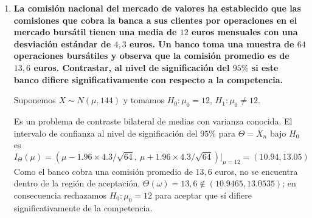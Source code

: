 \begin{enumerate}
  Tomamos el estimador $\Theta = \overline{X}_n$, $\alpha = 0.95$ (con $Q = 1.66$, $\overline{x}_n = 110$). Suponiendo que (hipótesis nula) $H_0 : X \sim N(100, 225)$ (el método no funciona) y exploramos la condición $1 - \alpha = \Prob(\overline{X}_n \geq a)$. Tenemos
  \[
    1 - \alpha = \Prob(\overline{X}_n \geq a) \iff 1 - \alpha = \Prob(N \geq (a - \mu)/\Sigma) = 1 - \Phi((a - \mu)/\Sigma)
  \]
  \[
    \iff \alpha = \Phi((a - \mu)/\Sigma) \iff a = \mu + \frac{\sigma}{\sqrt{n}} Q_\alpha
  \]
  Regla de decisión: No rechazar $H_0 \iff \overline{x}_n < \mu + \frac{\sigma}{\sqrt{n}} Q_\alpha \equiv a$.

  Las regiones de rechazo son
  \[
    F = (a, \infty); \quad S_1 := \{\vec{x} : (x_1 + \dots + x_n > na\} \in \mathbb{R}^n; \quad C := \{\omega : \overline{X}_n(\omega) > a\} \in \Omega
  \]
  Bajo la hipótesis nula $\mu = 100$ el valor obtenido
  \[
    t \equiv \overline{x}_n = 110; \quad \mu = 100; \quad Q_\alpha = 1.65; \quad \frac{\sigma}{\sqrt{n}} Q_\alpha = \frac{15}{\sqrt{8}} \times 1.65 = 8.75; \implies
  \]
  \[
    110 > \mu + \frac{\sigma}{\sqrt{n}} Q_\alpha = 108.75
  \]
  luego al nivel de seguridad del $95\%$ debemos rechazar $H_0$ y aceptar $H_1$ (el método sí funciona).
  El $p$-valor se calcula como
  \[
    p := \Prob(\overline{X}_n \geq 110) = \Prob(N \geq (t - \mu)/\Sigma) = \Prob(N \geq 10 \times \sqrt{8}/15) = \Prob(N \geq 1.88) = 0.03
  \]
  bajo $H_0 : \mu = \mu_0$.
  \item \textbf{La comisión nacional del mercado de valores ha establecido que las comisiones que cobra la banca a sus clientes por operaciones en el mercado bursátil tienen una media de $12$ euros mensuales con una desviación estándar de $4{,}3$ euros. Un banco toma una muestra de $64$ operaciones bursátiles y observa que la comisión promedio es de $13{,}6$ euros. Contrastar, al nivel de significación del $95\%$ si este banco difiere significativamente con respecto a la competencia.}
  
  Suponemos $X \sim N(\mu, 144)$ y tomamos $H_0 : \mu_0 = 12$, $H_1 : \mu_0 \neq 12$.

  Es un problema de contraste bilateral de medias con varianza conocida. El intervalo de confianza al nivel de significación del $95\%$ para $\Theta = \overline{X}_n$ bajo $H_0$ es
  \[
    I_\Theta(\mu) = (\mu - 1.96 \times 4.3/\sqrt{64},\ \mu + 1.96 \times 4.3/\sqrt{64})\big|_{\mu = 12} = (10.94, 13.05)
  \]
  Como el banco cobra una comisión promedio de $13{,}6$ euros, no se encuentra dentro de la región de aceptación, $\Theta(\omega) = 13{,}6 \notin (10.9465, 13.0535)$; en consecuencia rechazamos $H_0 : \mu_0 = 12$ para aceptar que sí difiere significativamente de la competencia.


\end{enumerate}
